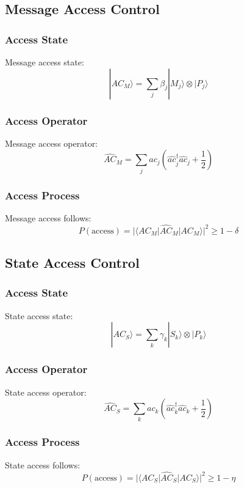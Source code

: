 \documentclass[12pt]{article}
\begin{document}
\subsection{Message Access Control}
\subsubsection{Access State}
Message access state:
\begin{equation}
|AC_M\rangle = \sum_j \beta_j|M_j\rangle \otimes |P_j\rangle
\end{equation}
\subsubsection{Access Operator}
Message access operator:
\begin{equation}
\hat{AC}_M = \sum_j ac_j(\hat{ac}_j^\dagger\hat{ac}_j + \frac{1}{2})
\end{equation}
\subsubsection{Access Process}
Message access follows:
\begin{equation}
P(\text{access}) = |\langle AC_M|\hat{AC}_M|AC_M\rangle|^2 \geq 1 - \delta
\end{equation}
\subsection{State Access Control}
\subsubsection{Access State}
State access state:
\begin{equation}
|AC_S\rangle = \sum_k \gamma_k|S_k\rangle \otimes |P_k\rangle
\end{equation}
\subsubsection{Access Operator}
State access operator:
\begin{equation}
\hat{AC}_S = \sum_k ac_k(\hat{ac}_k^\dagger\hat{ac}_k + \frac{1}{2})
\end{equation}
\subsubsection{Access Process}
State access follows:
\begin{equation}
P(\text{access}) = |\langle AC_S|\hat{AC}_S|AC_S\rangle|^2 \geq 1 - \eta
\end{equation}
\end{document}

